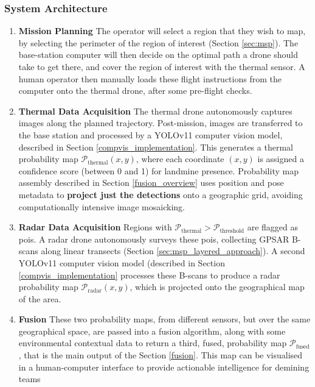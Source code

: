 

    \subsubsection{System Architecture} \label{compvis_methods}
    
        \begin{enumerate}
        
            \item \textbf{Mission Planning} The operator will select a region that they wish to map, by selecting the perimeter of the region of interest (Section \ref{sec:msp}). The base-station computer will then decide on the optimal path a drone should take to get there, and cover the region of interest with the thermal sensor. A human operator then manually loads these flight instructions from the computer onto the thermal drone, after some pre-flight checks.
            
            \item \textbf{Thermal Data Acquisition} The thermal drone autonomously captures images along the planned trajectory. Post-mission, images are transferred to the base station and processed by a YOLOv11 computer vision model, described in Section \ref{compvis_implementation}. This generates a thermal probability map \newline \(\mathcal{P}_{\text{thermal}}(x,y)\), where each coordinate \((x,y)\) is assigned a confidence score (between 0 and 1) for landmine presence. Probability map assembly described in Section \ref{fusion_overview} uses position and pose metadata to \textbf{project just the detections} onto a geographic grid, avoiding computationally intensive image mosaicking.
            
            \item \textbf{Radar Data Acquisition} Regions with \(\mathcal{P}_{\text{thermal}} > \mathcal{P}_{\text{threshold}}\) are flagged as \gls{poi}s. A radar drone autonomously surveys these \gls{poi}s, collecting GPSAR B-scans along linear transects (Section \ref{sec:msp_layered_approach}). A second YOLOv11 computer vision model (described in Section \ref{compvis_implementation} processes these B-scans to produce a radar probability map \(\mathcal{P}_{\text{radar}}(x,y)\), which is projected onto the geographical map of the area.
            
            \item \textbf{Fusion} These two probability maps, from different sensors, but over the same geographical space, are passed into a fusion algorithm, along with some environmental contextual data to return a third, fused, probability map $\mathcal{P}_{\text{fused}}$, that is the main output of the Section \ref{fusion}. This map can be visualised in a human-computer interface to provide actionable intelligence for demining teams
            
        \end{enumerate}


